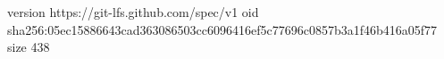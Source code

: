 version https://git-lfs.github.com/spec/v1
oid sha256:05ec15886643cad363086503cc6096416ef5c77696c0857b3a1f46b416a05f77
size 438
